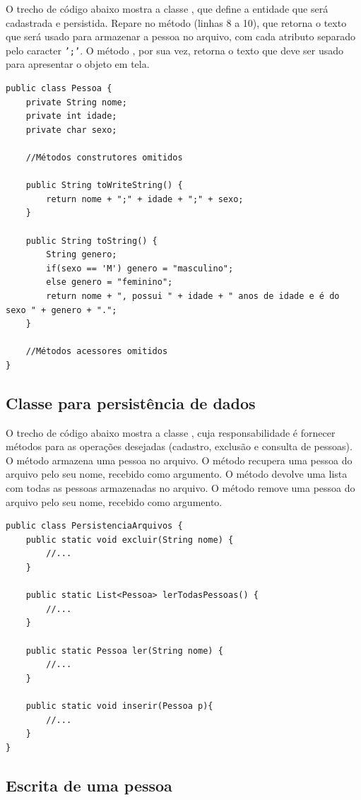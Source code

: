 O trecho de código abaixo mostra a classe , que define a entidade que será cadastrada e persistida. Repare no método  (linhas 8 a 10), que retorna o texto que será usado para armazenar a pessoa no arquivo, com cada atributo separado pelo caracter \texttt{';'}. O método , por sua vez, retorna o texto que deve ser usado para apresentar o objeto em tela.

\begin{verbatim}
public class Pessoa {
	private String nome;
	private int idade;
	private char sexo;

	//Métodos construtores omitidos

	public String toWriteString() {
		return nome + ";" + idade + ";" + sexo;
	}

	public String toString() {
		String genero;
		if(sexo == 'M') genero = "masculino";
		else genero = "feminino";
		return nome + ", possui " + idade + " anos de idade e é do sexo " + genero + ".";
	}

	//Métodos acessores omitidos
}
\end{verbatim}

\subsection{Classe para persistência de dados}

O trecho de código abaixo mostra a classe , cuja responsabilidade é fornecer métodos para as operações desejadas (cadastro, exclusão e consulta de pessoas). O método  armazena uma pessoa no arquivo. O método  recupera uma pessoa do arquivo pelo seu nome, recebido como argumento. O método  devolve uma lista com todas as pessoas armazenadas no arquivo. O método  remove uma pessoa do arquivo pelo seu nome, recebido como argumento.

\begin{verbatim}
public class PersistenciaArquivos {
	public static void excluir(String nome) {
		//...
	}

	public static List<Pessoa> lerTodasPessoas() {
		//...
	}

	public static Pessoa ler(String nome) {
		//...
	}

	public static void inserir(Pessoa p){
		//...
	}
}
\end{verbatim}

\subsection{Escrita de uma pessoa}

